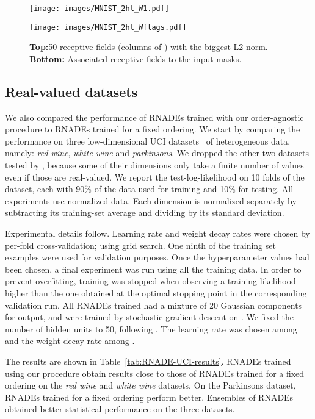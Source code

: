 \documentclass{article}
\begin{document}
\begin{figure}
\centerline{\texttt{[image: images/MNIST\_2hl\_W1.pdf]}}
\centerline{\texttt{[image: images/MNIST\_2hl\_Wflags.pdf]}}
\caption{\textbf{Top:}50 receptive fields (columns of ) with the
biggest L2 norm.
\textbf{Bottom:} Associated receptive fields to the input masks.}
\label{fig:MNIST-rfs}
\end{figure}

\subsection{Real-valued datasets}
We also compared the performance of RNADEs trained with our order-agnostic
procedure to RNADEs trained for a fixed ordering. We start by comparing the
performance on three low-dimensional UCI datasets~\cite{Bache+Lichman:2013} of heterogeneous
data, namely: \emph{red wine}, \emph{white wine} and \emph{parkinsons}. We dropped the
other two datasets tested by \citet{UriaB2013}, because some of their dimensions only
take a finite number of values even if those are real-valued.
We report the test-log-likelihood on 10 folds of the dataset, each with 90\%
of the data used for training and 10\% for testing. All experiments use
normalized data. Each dimension is normalized separately by subtracting its
training-set average and dividing by its standard deviation.

Experimental details follow. Learning rate and weight decay rates were chosen
by per-fold cross-validation; using grid search. One ninth of the training set
examples were used for validation purposes. Once the hyperparameter values had
been chosen, a final experiment was run using all the training data. In order to
prevent overfitting, training was stopped when observing a training likelihood higher than
the one obtained at the optimal stopping point in the corresponding validation
run. All RNADEs trained had a mixture of 20 Gaussian components for output, and
were trained by stochastic gradient descent on . We fixed the number of
hidden units to 50, following \citet{UriaB2013}. The learning rate was chosen among
 and the weight decay rate among .

The results are shown in Table~\ref{tab:RNADE-UCI-results}. RNADEs trained using our
procedure obtain results close to those of RNADEs trained for a fixed ordering
on the \emph{red wine} and \emph{white wine} datasets. On the Parkinsons dataset,
RNADEs trained for a fixed ordering perform better. Ensembles of
RNADEs obtained better statistical performance on the three datasets.
\end{document}
